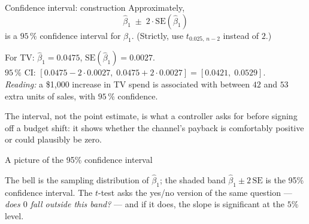 \documentclass[aspectratio=169,11pt]{beamer}
\begin{document}
\begin{frame}{Confidence interval: construction}
  Approximately,
  \[
    \boxed{\;\hat\beta_1 \;\pm\; 2\cdot \mathrm{SE}(\hat\beta_1)\;}
  \]
  is a $95\,\%$ confidence interval for $\beta_1$. (Strictly, use
  $t_{0.025,\,n-2}$ instead of $2$.)
  \begin{numexample}
    For TV: $\hat\beta_1 = 0.0475$, $\mathrm{SE}(\hat\beta_1) = 0.0027$.\\
    $95\,\%$ CI: $[0.0475 - 2\cdot 0.0027,\; 0.0475 + 2\cdot 0.0027]
                 = [0.0421,\; 0.0529]$.\\
    \emph{Reading:} a \$1{,}000 increase in TV spend is associated with
    between $42$ and $53$ extra units of sales, with $95\,\%$
    confidence.
  \end{numexample}
  The interval, not the point estimate, is what a controller asks for before
  signing off a budget shift: it shows whether the channel's payback is
  comfortably positive or could plausibly be zero.
\end{frame}

\begin{frame}{A picture of the 95\% confidence interval}
  \begin{center}
  \end{center}
  \begin{takeaway}
    The bell is the sampling distribution of $\hat\beta_1$; the shaded
    band $\hat\beta_1\pm 2\,\mathrm{SE}$ is the 95\% confidence interval.
    The $t$-test asks the yes/no version of the same question ---
    \emph{does $0$ fall outside this band?} --- and if it does, the slope
    is significant at the $5\%$ level.
  \end{takeaway}
\end{frame}
\end{document}
